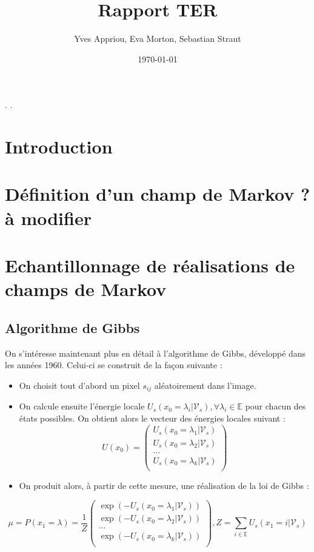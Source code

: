 \documentclass[a4paper, 12pt]{article}
\title{Rapport TER}
\author{Yves Appriou, Eva Morton, Sebastian Straut}
\date{\today}
\begin{document}
\maketitle

\tableofcontents.
\newpage.
\section{Introduction}
\section{Définition d'un champ de Markov ?à modifier}
\section{Echantillonnage de réalisations de champs de Markov}
\subsection[Algorithme de Gibbs]{Algorithme de Gibbs}
On s'intéresse maintenant plus en détail à l'algorithme de Gibbs, développé dans les années 1960. Celui-ci se construit de la façon suivante : 
\begin{itemize}
\item On choisit tout d'abord un pixel $s_{ij} $ aléatoirement dans l'image.
\item On calcule ensuite l'énergie locale $U_s(x_0=\lambda_i| \mathcal{V}_s), \forall \lambda_i \in \mathbb{E}$ pour chacun des états possibles. On obtient alors le vecteur des énergies locales suivant : 
\[
  U(x_0) = \left(
          \begin{array}{ll}
            U_s(x_0=\lambda_1| \mathcal{V}_s) \\
            U_s(x_0=\lambda_2| \mathcal{V}_s) \\
            ...\\
            U_s(x_0=\lambda_k| \mathcal{V}_s) \\
          \end{array}
        \right)
\]
\item On produit alors, à partir de cette mesure, une réalisation de la loi de Gibbs : 
\end{itemize}
\[
  \mu = P(x_1 = \lambda) = \frac{1}{Z} \left(
          \begin{array}{ll}
            \exp(-U_s(x_0=\lambda_1| \mathcal{V}_s)) \\
            \exp(-U_s(x_0=\lambda_2| \mathcal{V}_s)) \\
            ...\\
            \exp(-U_s(x_0=\lambda_k| \mathcal{V}_s)) \\
          \end{array}
        \right)
        , Z= \sum_{i\in \mathbb{E}} {U_s(x_1=i | \mathcal{V}_s)}
\]
\end{document}
